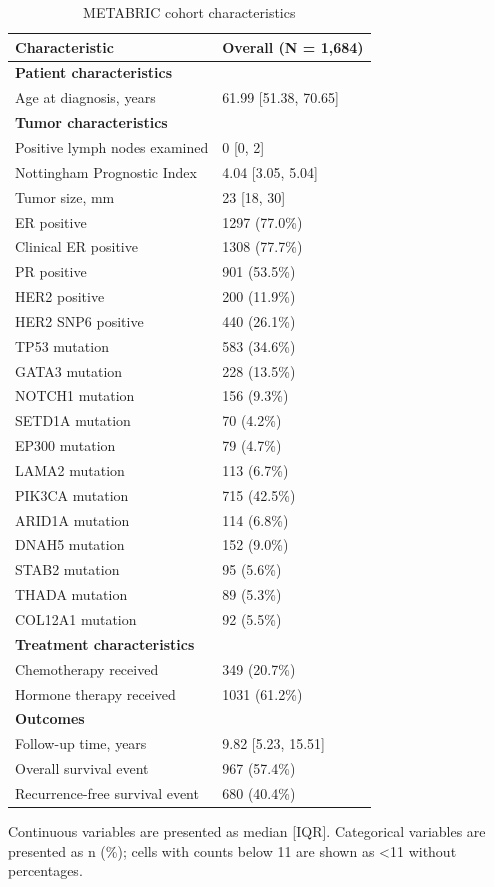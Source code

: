 \begin{table}[!htbp]
\centering
\caption{METABRIC cohort characteristics}
\begin{tabular}{ll}
\toprule
Characteristic & Overall (N = 1,684) \\
\midrule
\multicolumn{2}{l}{\textbf{Patient characteristics}} \\
Age at diagnosis, years & 61.99 [51.38, 70.65] \\
\midrule
\multicolumn{2}{l}{\textbf{Tumor characteristics}} \\
Positive lymph nodes examined & 0 [0, 2] \\
Nottingham Prognostic Index & 4.04 [3.05, 5.04] \\
Tumor size, mm & 23 [18, 30] \\
ER positive & 1297 (77.0\%) \\
Clinical ER positive & 1308 (77.7\%) \\
PR positive & 901 (53.5\%) \\
HER2 positive & 200 (11.9\%) \\
HER2 SNP6 positive & 440 (26.1\%) \\
TP53 mutation & 583 (34.6\%) \\
GATA3 mutation & 228 (13.5\%) \\
NOTCH1 mutation & 156 (9.3\%) \\
SETD1A mutation & 70 (4.2\%) \\
EP300 mutation & 79 (4.7\%) \\
LAMA2 mutation & 113 (6.7\%) \\
PIK3CA mutation & 715 (42.5\%) \\
ARID1A mutation & 114 (6.8\%) \\
DNAH5 mutation & 152 (9.0\%) \\
STAB2 mutation & 95 (5.6\%) \\
THADA mutation & 89 (5.3\%) \\
COL12A1 mutation & 92 (5.5\%) \\
\midrule
\multicolumn{2}{l}{\textbf{Treatment characteristics}} \\
Chemotherapy received & 349 (20.7\%) \\
Hormone therapy received & 1031 (61.2\%) \\
\midrule
\multicolumn{2}{l}{\textbf{Outcomes}} \\
Follow-up time, years & 9.82 [5.23, 15.51] \\
Overall survival event & 967 (57.4\%) \\
Recurrence-free survival event & 680 (40.4\%) \\
\bottomrule
\end{tabular}
\begin{minipage}{0.95\linewidth}
\vspace{0.5em}
\footnotesize Continuous variables are presented as median [IQR]. Categorical variables are presented as n (\%); cells with counts below 11 are shown as <11 without percentages.
\end{minipage}
\end{table}
